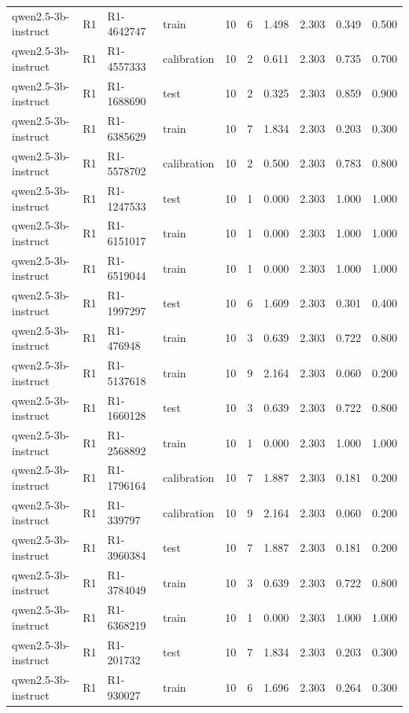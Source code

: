 \begin{table}
\begin{tabular}{llllrrrrrr}
qwen2.5-3b-instruct & R1 & R1-4642747 & train & 10 & 6 & 1.498 & 2.303 & 0.349 & 0.500 \\
qwen2.5-3b-instruct & R1 & R1-4557333 & calibration & 10 & 2 & 0.611 & 2.303 & 0.735 & 0.700 \\
qwen2.5-3b-instruct & R1 & R1-1688690 & test & 10 & 2 & 0.325 & 2.303 & 0.859 & 0.900 \\
qwen2.5-3b-instruct & R1 & R1-6385629 & train & 10 & 7 & 1.834 & 2.303 & 0.203 & 0.300 \\
qwen2.5-3b-instruct & R1 & R1-5578702 & calibration & 10 & 2 & 0.500 & 2.303 & 0.783 & 0.800 \\
qwen2.5-3b-instruct & R1 & R1-1247533 & test & 10 & 1 & 0.000 & 2.303 & 1.000 & 1.000 \\
qwen2.5-3b-instruct & R1 & R1-6151017 & train & 10 & 1 & 0.000 & 2.303 & 1.000 & 1.000 \\
qwen2.5-3b-instruct & R1 & R1-6519044 & train & 10 & 1 & 0.000 & 2.303 & 1.000 & 1.000 \\
qwen2.5-3b-instruct & R1 & R1-1997297 & test & 10 & 6 & 1.609 & 2.303 & 0.301 & 0.400 \\
qwen2.5-3b-instruct & R1 & R1-476948 & train & 10 & 3 & 0.639 & 2.303 & 0.722 & 0.800 \\
qwen2.5-3b-instruct & R1 & R1-5137618 & train & 10 & 9 & 2.164 & 2.303 & 0.060 & 0.200 \\
qwen2.5-3b-instruct & R1 & R1-1660128 & test & 10 & 3 & 0.639 & 2.303 & 0.722 & 0.800 \\
qwen2.5-3b-instruct & R1 & R1-2568892 & train & 10 & 1 & 0.000 & 2.303 & 1.000 & 1.000 \\
qwen2.5-3b-instruct & R1 & R1-1796164 & calibration & 10 & 7 & 1.887 & 2.303 & 0.181 & 0.200 \\
qwen2.5-3b-instruct & R1 & R1-339797 & calibration & 10 & 9 & 2.164 & 2.303 & 0.060 & 0.200 \\
qwen2.5-3b-instruct & R1 & R1-3960384 & test & 10 & 7 & 1.887 & 2.303 & 0.181 & 0.200 \\
qwen2.5-3b-instruct & R1 & R1-3784049 & train & 10 & 3 & 0.639 & 2.303 & 0.722 & 0.800 \\
qwen2.5-3b-instruct & R1 & R1-6368219 & train & 10 & 1 & 0.000 & 2.303 & 1.000 & 1.000 \\
qwen2.5-3b-instruct & R1 & R1-201732 & test & 10 & 7 & 1.834 & 2.303 & 0.203 & 0.300 \\
qwen2.5-3b-instruct & R1 & R1-930027 & train & 10 & 6 & 1.696 & 2.303 & 0.264 & 0.300 \\

\end{tabular}
\end{table}
